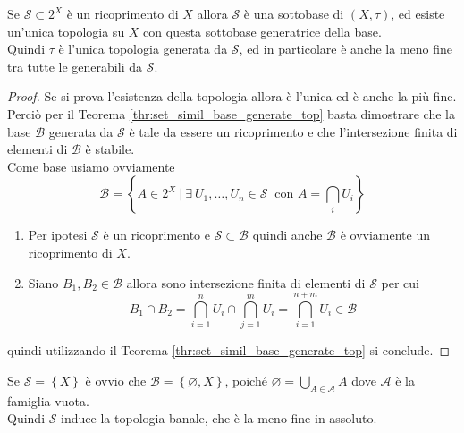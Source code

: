 \begin{proposition}
	Se $\mathcal{S} \subset 2^X$ è un ricoprimento di $X$ allora $\mathcal{S}$ è una sottobase di $(X,\tau)$, ed esiste un'unica topologia su $X$ con questa sottobase generatrice della base. \\ Quindi $\tau$ è l'unica topologia generata da $\mathcal{S}$, ed in particolare è anche la meno fine tra tutte le generabili da $\mathcal{S}$.
\end{proposition}
\begin{proof}
	Se si prova l'esistenza della topologia allora è l'unica ed è anche la più fine.
	Perciò per il Teorema \ref{thr:set_simil_base_generate_top} basta dimostrare che la base $\mathcal{B}$ generata da $\mathcal{S}$ è tale da essere un ricoprimento e che l'intersezione finita di elementi di $\mathcal{B}$ è stabile.\\
	Come base usiamo ovviamente
	\begin{equation*}
	\mathcal{B} = \left\{ A \in 2^X \ \Big|\ \exists \ U_1, \dots, U_n \in \mathcal{S} \ \text{ con } A = \bigcap_{i } U_i \right\}
	\end{equation*}
	\begin{enumerate}
		\item Per ipotesi $\mathcal{S}$ è un ricoprimento e $\mathcal{S} \subset \mathcal{B}$ quindi anche $\mathcal{B}$ è ovviamente un ricoprimento di $X$.
		\item Siano $B_1, B_2 \in \mathcal{B}$ allora sono intersezione finita di elementi di $\mathcal{S}$ per cui
		\begin{equation*}
			B_1 \cap B_2 = \bigcap^n_{i=1} U_i \cap \bigcap^{m}_{j=1} U_i = \bigcap^{n+m}_{i=1} U_i  \in \mathcal{B}
		\end{equation*}
	\end{enumerate}
	quindi utilizzando il Teorema \ref{thr:set_simil_base_generate_top} si conclude.
	\end{proof}

\begin{remark}
	Se $\mathcal{S} = \left\{X\right\}$ è ovvio che $\mathcal{B} = \left\{\varnothing, X\right\}$, poiché $\varnothing = \bigcup_{A \in \mathcal{A}} A $ dove $\mathcal{A}$ è la famiglia vuota. \\ Quindi $\mathcal{S}$ induce la topologia banale, che è la meno fine in assoluto.
\end{remark}



\newpage
